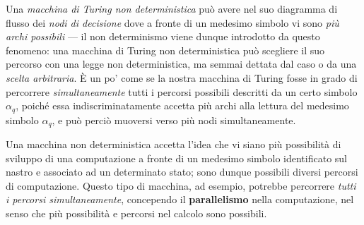 \documentclass[10pt]{\classname}
\begin{document}
Una \emph{macchina di Turing non deterministica} può avere nel suo diagramma di
flusso dei \emph{nodi di decisione} dove a fronte di un medesimo simbolo vi
sono \emph{più archi possibili} --- il non determinismo viene dunque introdotto
da questo fenomeno: una macchina di Turing non deterministica può scegliere il
suo percorso con una legge non deterministica, ma semmai dettata dal caso o da
una \emph{scelta arbitraria}. È un po' come se la nostra macchina di Turing
fosse in grado di percorrere \emph{simultaneamente} tutti i percorsi possibili
descritti da un certo simbolo $\alpha_q$, poiché essa indiscriminatamente
accetta più archi alla lettura del medesimo simbolo $\alpha_q$, e può perciò
muoversi verso più nodi simultaneamente.

Una macchina non deterministica accetta l'idea che vi siano più possibilità di
sviluppo di una computazione a fronte di un medesimo simbolo identificato sul
nastro e associato ad un determinato stato; sono dunque possibili diversi
percorsi di computazione. Questo tipo di macchina, ad esempio, potrebbe
percorrere \emph{tutti i percorsi simultaneamente}, concependo il
\textbf{parallelismo} nella computazione, nel senso che più possibilità e
percorsi nel calcolo sono possibili. 
\end{document}

